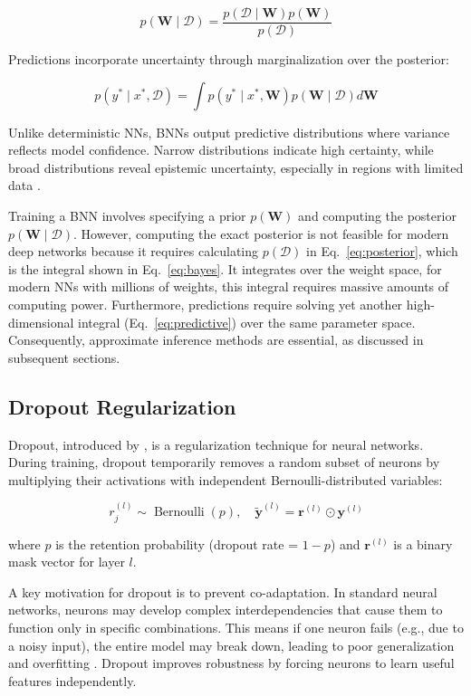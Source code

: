 \begin{equation}
p(\mathbf{W} \mid \mathcal{D}) = \frac{p(\mathcal{D} \mid \mathbf{W})  p(\mathbf{W})}{p(\mathcal{D})}
\label{eq:posterior}
\end{equation}

Predictions incorporate uncertainty through marginalization over the posterior:

\begin{equation}
p(y^* \mid x^*, \mathcal{D}) = \int p(y^* \mid x^*, \mathbf{W})  p(\mathbf{W} \mid \mathcal{D})  d\mathbf{W}
\label{eq:predictive}
\end{equation}

Unlike deterministic NNs, BNNs output predictive distributions where variance reflects model confidence.
Narrow distributions indicate high certainty, while broad distributions reveal epistemic uncertainty,
especially in regions with limited data \citep{Jospin2022bnns}.

Training a BNN involves specifying a prior $p(\mathbf{W})$ and computing the posterior $p(\mathbf{W}
\mid \mathcal{D})$. However, computing the exact posterior is not feasible for modern deep networks
because it requires calculating $p(\mathcal{D})$ in Eq.~\eqref{eq:posterior}, which is the integral
shown in Eq.~\eqref{eq:bayes}. It integrates over the weight space, for modern NNs with millions of
weights, this integral requires massive amounts of computing power. Furthermore, predictions require
solving yet another high-dimensional integral (Eq.~\eqref{eq:predictive}) over the same parameter
space. Consequently, approximate inference methods are essential, as discussed in subsequent sections.


\subsection{Dropout Regularization}
\label{methodology:dropout}
Dropout, introduced by \citet{srivastava2014dropout}, is a regularization technique for neural networks.
During training, dropout temporarily removes a random subset of neurons by multiplying their activations
with independent Bernoulli-distributed variables:

\[
r_j^{(l)} \sim \operatorname{Bernoulli}(p), 
\quad 
\tilde{\mathbf{y}}^{(l)} = \mathbf{r}^{(l)} \odot \mathbf{y}^{(l)}
\]

where $p$ is the retention probability (dropout rate = $1-p$) and $\mathbf{r}^{(l)}$ is a binary mask vector for layer $l$.

A key motivation for dropout is to prevent co-adaptation. In standard neural networks,
neurons may develop complex interdependencies that cause them to function only in specific combinations.
This means if one neuron fails (e.g., due to a noisy input), the entire model may break down,
leading to poor generalization and overfitting \citep{hinton2012}.
Dropout improves robustness by forcing neurons to
learn useful features independently.

